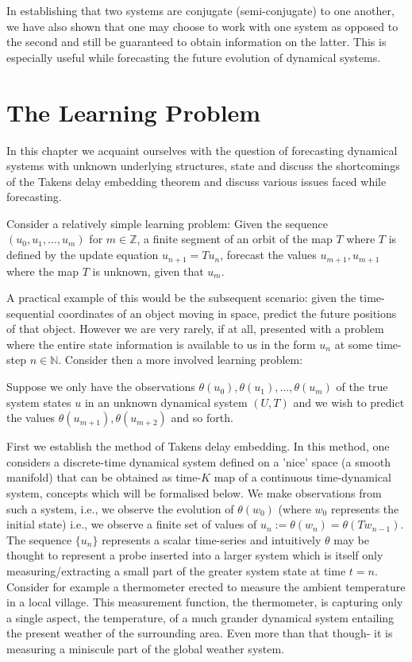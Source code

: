 \documentclass[a4paper,12pt,twoside]{report}
\begin{document}
In establishing that two systems are conjugate (semi-conjugate) to one another, we have also shown that one may choose to work with one system as opposed to the second and still be guaranteed to obtain information on the latter. This is especially useful while forecasting the future evolution of dynamical systems. 


\chapter{The Learning Problem}\label{ch3}

In this chapter we acquaint ourselves with the question of forecasting dynamical systems with unknown underlying structures, state and discuss the shortcomings of the Takens delay embedding theorem and discuss various issues faced while forecasting. 

Consider a relatively simple learning problem: 
Given the sequence $(u_0, u_1, \ldots, u_m)$ for $m\in\mathbb{Z}$, a finite segment of an orbit of the map $T$ where $T$ is defined by the update equation $u_{n+1} = Tu_n$, forecast the values $u_{m+1}, u_{m+1}$ where the map $T$ is unknown, given that $u_m$. 

A practical example of this would be the subsequent scenario: given the time-sequential coordinates of an object moving in space, predict the future positions of that object. However we are very rarely, if at all, presented with a problem where the entire state information is available to us in the form $u_n$ at some time-step $n\in\mathbb{N}$. Consider then a more involved learning problem:

Suppose we only have the observations $\theta(u_0), \theta(u_1), \ldots, \theta(u_m)$ of the true system states $u$ in an unknown dynamical system $(U,T)$ and we wish to predict the values $\theta(u_{m+1}), \theta(u_{m+2})$ and so forth.

First we establish the method of Takens delay embedding. 
In this method, one considers a discrete-time dynamical system defined on a 'nice' space (a smooth manifold) that can be obtained as time-$K$ map of a continuous time-dynamical system, concepts which will be formalised below.
We make observations from such a system, i.e., we observe the evolution of $\theta(w_0)$ (where $w_0$ represents the initial state) i.e., we observe  a finite set of values of $u_n :=  \theta(w_n) = \theta(Tw_{n-1})$. The sequence $\{u_n\}$ represents a scalar time-series and intuitively $\theta$ may be thought to represent a probe inserted into a larger system which is itself only measuring/extracting a small part of the greater system state at time $t=n$. 
Consider for example a thermometer erected to measure the ambient temperature in a local village. This measurement function, the thermometer, is capturing only a single aspect, the temperature, of a much grander dynamical system entailing the present weather of the surrounding area. Even more than that though- it is measuring a miniscule part of the global weather system. 
\end{document}
